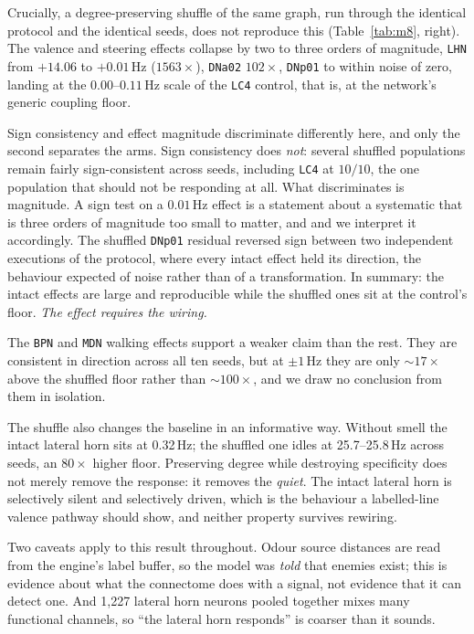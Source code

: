 \documentclass[10pt,twoside]{article}
\newcommand{\cell}[1]{\texttt{#1}}
\begin{document}
Crucially, a degree-preserving shuffle of the same graph, run through the
identical protocol and the identical seeds, does not reproduce this
(Table~\ref{tab:m8}, right). The valence and steering effects collapse by two
to three orders of magnitude, \cell{LHN} from $+14.06$ to $+0.01$\,Hz
($1563\times$), \cell{DNa02} $102\times$, \cell{DNp01} to within noise of
zero, landing at the $0.00$--$0.11$\,Hz scale of the \cell{LC4} control, that
is,
at the network's generic coupling floor.

Sign consistency and effect magnitude discriminate differently here, and only
the second separates the arms. Sign consistency does \emph{not}: several
shuffled populations remain fairly
sign-consistent across seeds, including \cell{LC4} at $10/10$, the one
population that should not be responding at all. What discriminates is
magnitude. A sign test on a $0.01$\,Hz effect is a statement
about a systematic that is three orders of magnitude too small to matter, and
and we interpret it accordingly. The shuffled \cell{DNp01} residual
reversed sign between two independent executions of the protocol, where every
intact effect held its direction, the behaviour expected of noise rather
than of a transformation. In summary: the intact effects are large and
reproducible while the shuffled ones sit at the control's floor.
\emph{The effect requires the wiring.}

The \cell{BPN} and \cell{MDN} walking effects support a weaker claim than the
rest. They are consistent in direction across all ten seeds, but at
$\pm1$\,Hz they are only ${\sim}17\times$ above the shuffled floor rather than
${\sim}100\times$, and we draw no conclusion from them in isolation.

The shuffle also changes the baseline in an informative way. Without smell the
intact lateral horn sits at 0.32\,Hz; the shuffled one idles at
25.7--25.8\,Hz across seeds, an $80\times$ higher floor. Preserving degree
while destroying specificity does not merely
remove the response: it removes the \emph{quiet}. The intact lateral horn is
selectively silent and selectively driven, which is the behaviour a
labelled-line valence pathway should show, and neither property survives
rewiring.

Two caveats apply to this result throughout. Odour source distances are read from the
engine's label buffer, so the model was \emph{told} that enemies exist; this is
evidence about what the connectome does with a signal, not evidence that it can
detect one. And 1{,}227 lateral horn neurons pooled together mixes many
functional channels, so ``the lateral horn responds'' is coarser than it sounds.
\end{document}
